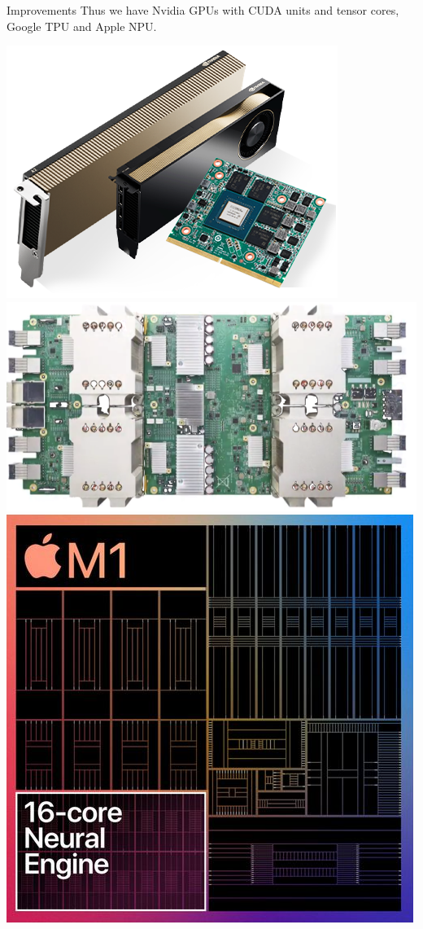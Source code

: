 \documentclass[UTF8]{beamer}
\begin{document}
\begin{frame}{Improvements}
  Thus we have Nvidia GPUs with CUDA units and tensor cores, Google TPU and Apple NPU.
  \begin{center}
    \includegraphics[height=4\baselineskip]{figure/nvidia_gpu.png}
    \hfill
    \includegraphics[height=4\baselineskip]{figure/google_tpu.png}
    \hfill
    \includegraphics[height=4\baselineskip]{figure/apple_m1_npu.png}
  \end{center}
\end{frame}
\end{document}
